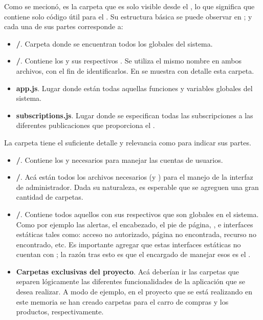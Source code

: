 %

Como se mecionó, \clientFolder es la carpeta que es solo visible desde el \clientSideAS, lo que significa que contiene solo código útil para el \clientAS. Su estructura básica se puede observar en ; y cada una de sus partes corresponde a:

	\begin{itemize}
		\item
			\textbf{\helpersMETEOR/}. Carpeta donde se encuentran todos los \helpersMETEOR globales del sistema.
		\item
			\textbf{\templatesMETEOR/}. Contiene los \templatesMETEOR y sus respectivos \helpersMETEOR. Se utiliza el mismo nombre en ambos archivos, con el fin de identificarlos. En  se muestra con detalle esta carpeta.
		\item
			\textbf{app.js}. Lugar donde están todas aquellas funciones y variables globales del sistema.
		\item
			\textbf{subscriptions.js}. Lugar donde se especifican todas las subscripciones a las diferentes publicaciones que proporciona el \serverAS.
	\end{itemize}



La carpeta \templateMETEOR tiene el suficiente detalle y relevancia como para indicar sus partes.

\begin{itemize}
	\item
		\textbf{\folderAccount/}. Contiene los \templatesMETEOR y \helpersMETEOR necesarios para manejar las cuentas de usuarios. 
	\item
		\textbf{\folderDashboard/}. Acá están todos los archivos necesarios (\templatesMETEOR y \helpersMETEOR) para el manejo de la interfaz de administrador. Dada su naturaleza, es esperable que se agreguen una gran cantidad de carpetas.
	\item
		\textbf{\folderLayout/}. Contiene todos aquellos \templatesMETEOR con sus respectivos \helpersMETEOR que son globales en el sistema. Como por ejemplo las alertas, el encabezado, el pie de página, \loadingCPT, e interfaces estáticas tales como: acceso no autorizado, página no encontrada, recurso no encontrado, etc. Es importante agregar que estas interfaces estáticas no cuentan con \helpersMETEOR; la razón tras esto es que el encargado de manejar esos \templatesMETEOR es el \packagesAS \nameRouter.
	\item
		\textbf{Carpetas exclusivas del proyecto}. Acá deberían ir las carpetas que separen lógicamente las diferentes funcionalidades de la aplicación que se desea realizar. A modo de ejemplo, en el proyecto que se está realizando en este memoria se han creado carpetas para el carro de compras y los productos, respectivamente.
\end{itemize}

